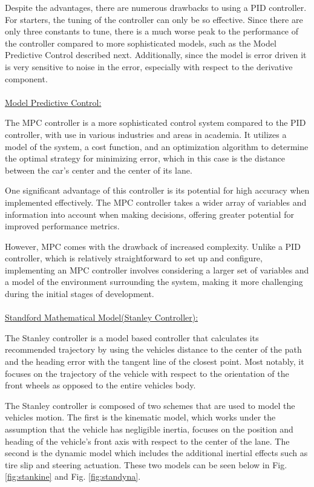 \documentclass[titlepage,draft]{article}
\begin{document}
{Despite the advantages, there are numerous drawbacks to using a PID controller. For starters, the tuning of the controller can only be so effective. Since there are only three constants to tune, there is a much worse peak to the performance of the controller compared to more sophisticated models, such as the Model Predictive Control described next. Additionally, since the model is error driven it is very sensitive to noise in the error, especially with respect to the derivative component.\\~\\
\underline{Model Predictive Control:}

The MPC controller is a more sophisticated control system compared to the PID controller, with use in various industries and areas in academia.\cite{GARCIA1989335} It utilizes a model of the system, a cost function, and an optimization algorithm to determine the optimal strategy for minimizing error, which in this case is the distance between the car’s center and the center of its lane.

One significant advantage of this controller is its potential for high accuracy when implemented effectively. The MPC controller takes a wider array of variables and information into account when making decisions, offering greater potential for improved performance metrics.

However, MPC comes with the drawback of increased complexity. Unlike a PID controller, which is relatively straightforward to set up and configure, implementing an MPC controller involves considering a larger set of variables and a model of the environment surrounding the system, making it more challenging during the initial stages of development. \\~\\
\underline{Standford Mathematical Model(Stanley Controller):}

The Stanley controller is a model based controller that calculates its recommended trajectory by using the vehicles distance to the center of the path and the heading error with the tangent line of the closest point. Most notably, it focuses on the trajectory of the vehicle with respect to the orientation of the front wheels as opposed to the entire vehicles body\cite{4282788}.

The Stanley controller is composed of two schemes that are used to model the vehicles motion. The first is the kinematic model, which works under the assumption that the vehicle has negligible inertia, focuses on the position and heading of the vehicle's front axis with respect to the center of the lane. The second is the dynamic model which includes the additional inertial effects such as tire slip and steering actuation. These two models can be seen below in Fig. \ref{fig:stankine} and Fig. \ref{fig:standyna}.

}
\end{document}
